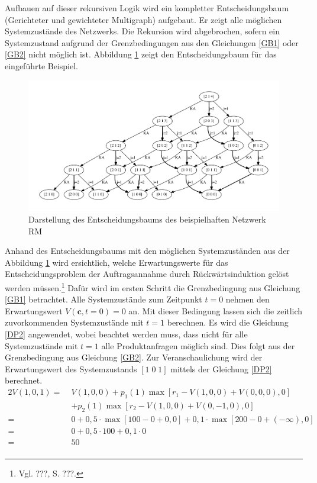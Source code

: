 Aufbauen auf dieser rekursiven Logik wird ein kompletter Entscheidungsbaum (Gerichteter und gewichteter Multigraph) aufgebaut. Er zeigt alle möglichen Systemzustände des Netzwerks. Die Rekursion wird abgebrochen, sofern ein Systemzustand aufgrund der Grenzbedingungen aus den Gleichungen \eqref{GB1} oder \eqref{GB2} nicht möglich ist. Abbildung \ref{B1} zeigt den Entscheidungsbaum für das eingeführte Beispiel.
\begin{figure}[h!]
  \begin{center}
    \includegraphics[width=150mm]{Bilder/Beispiel1.pdf}
    \caption{Darstellung des Entscheidungsbaums des beispielhaften Netzwerk RM}  \label{B1}
  \end{center}
\end{figure}

Anhand des Entscheidungsbaums mit den möglichen Systemzuständen aus der Abbildung \ref{B1} wird ersichtlich, welche Erwartungswerte für das Entscheidungsproblem der Auftragsannahme durch Rückwärtsinduktion gelöst werden müssen.\footnote{Vgl. ???, S. ???.} Dafür wird im ersten Schritt die Grenzbedingung aus Gleichung \eqref{GB1} betrachtet. Alle Systemzustände zum Zeitpunkt $t=0$ nehmen den Erwartungswert $V(\textbf{c}, t=0)=0$ an. Mit dieser Bedingung lassen sich die zeitlich zuvorkommenden Systemzustände mit $t=1$ berechnen. Es wird die Gleichung \eqref{DP2} angewendet, wobei beachtet werden muss, dass nicht für alle Systemzustände mit $t=1$ alle Produktanfragen möglich sind. Dies folgt aus der Grenzbedingung aus Gleichung \eqref{GB2}. Zur Veranschaulichung wird der Erwartungswert des Systemzustands $[1\;0\;1]$ mittels der Gleichung \eqref{DP2} berechnet.
\begin{alignat*}{2}
V(1,0,1)=\;&V(1,0,0)+p_{1}(1)\max[r_{1}-V(1,0,0)+V(0,0,0),0]\\
&+p_{2}(1)\max[r_{2}-V(1,0,0)+V(0,-1,0),0]\\
=\;&0+0,5\cdot\max[100-0+0,0]+0,1\cdot\max[200-0+(-\infty),0]\\
=\;&0+0,5\cdot 100+0,1\cdot0\\
=\;&50\\
\end{alignat*}

